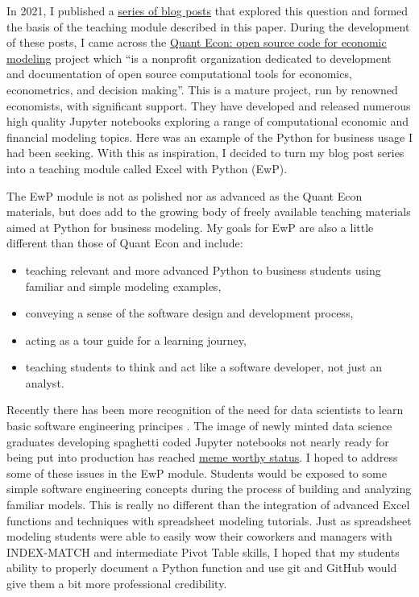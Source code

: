 \documentclass[ited,blindrev]{informs3}              %
\begin{document}
In 2021, I published a \href{https://bitsofanalytics.org/#category=excel}{series of blog posts} that explored this question and formed the basis of the teaching module described in this paper. During the development of these posts, I came across the \href{https://quantecon.org/}{Quant Econ: open source code for economic modeling} project which ``is a nonprofit organization dedicated to development and documentation of open source computational tools for economics, econometrics, and decision making''. This is a mature project, run by renowned economists, with significant support. They have developed and released numerous high quality Jupyter notebooks exploring a range of computational economic and financial modeling topics. Here was an example of the Python for business usage I had been seeking. With this as inspiration, I decided to turn my blog post series into a teaching module called Excel with Python (EwP). 

The EwP module is not as polished nor as advanced as the Quant Econ materials, but does add to the growing body of freely available teaching materials aimed at Python for business modeling. My goals for EwP are also a little different than those of Quant Econ and include:

\begin{itemize}
	\item teaching relevant and more advanced Python to business students using familiar and simple modeling examples,
	\item conveying a sense of the software design and development process,
	\item acting as a tour guide for a learning journey,
	\item teaching students to think and act like a software developer, not just an analyst.
\end{itemize}

Recently there has been more recognition of the need for data scientists to learn basic software engineering principes \cite{nelsonSoftwareEngineeringData2024,treadwaySoftwareEngineeringData2023,rodriguesBuildingReproducibleAnalytical2023}.  The image of newly minted data science graduates developing spaghetti coded Jupyter notebooks not nearly ready for being put into production has reached \href{https://www.reddit.com/r/ProgrammerHumor/comments/y2xe3n/like_every_time_ever_when_the_devops_engineer/}{meme worthy status}. I hoped to address some of these issues in the EwP module. Students would be exposed to some simple software engineering concepts during the process of building and analyzing familiar models. This is really no different than the integration of advanced Excel functions and techniques with spreadsheet modeling tutorials. Just as spreadsheet modeling students were able to easily wow their coworkers and managers with INDEX-MATCH and intermediate Pivot Table skills, I hoped that my students ability to properly document a Python function and use git and GitHub would give them a bit more professional credibility.
\end{document}
